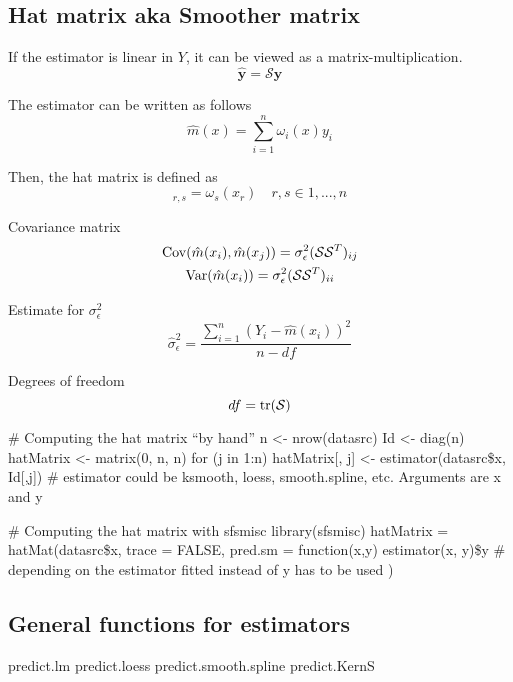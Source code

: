 \subsection{Hat matrix aka Smoother matrix}
\begin{theory}
If the estimator is linear in $Y$, it can be viewed as a matrix-multiplication.
\begin{equation*}
 \hat{\mathbf{y}} = \mathcal{S}\mathbf{y}
\end{equation*}

The estimator can be written as follows
\begin{equation*}
 \hat{m}(x) = \sum_{i=1}^n \omega_i(x)y_i
\end{equation*}

Then, the hat matrix is defined as
\begin{equation*}
 [\mathcal{S}]_{r,s} = \omega_s(x_r)\quad r,s \in {1, ..., n}
\end{equation*}

Covariance matrix
\begin{subequations}
 \begin{gather*}
  \operatorname{Cov}(\hat{m}(x_i), \hat{m}(x_j)) = \sigma_\epsilon^2(\mathcal{S}\mathcal{S}^T)_{ij}\\
  \operatorname{Var}(\hat{m}(x_i)) = \sigma_\epsilon^2(\mathcal{S}\mathcal{S}^T)_{ii}
 \end{gather*}
\end{subequations}

Estimate for $\sigma_\epsilon^2$
\begin{equation*}
 \hat{\sigma}_\epsilon^2 = \frac{\sum_{i=1}^n (Y_i - \hat{m}(x_i))^2}{n - df}
\end{equation*}

Degrees of freedom
\begin{equation*}
 df = \operatorname{tr}(\mathcal{S})
\end{equation*}

\end{theory}

\begin{code}
 # Computing the hat matrix ``by hand''
 n <- nrow(datasrc)
 Id <- diag(n)
 hatMatrix <- matrix(0, n, n)
 for (j in 1:n)
   hatMatrix[, j] <- estimator(datasrc\$x, Id[,j]) # estimator could be ksmooth, loess, smooth.spline, etc. Arguments are x and y

 # Computing the hat matrix with sfsmisc
 library(sfsmisc)
 hatMatrix = hatMat(datasrc\$x, trace = FALSE,
             pred.sm = function(x,y) estimator(x, y)\$y # depending on the estimator fitted instead of y has to be used
 )
\end{code}


\subsection{General functions for estimators}
\begin{code}
 predict.lm
 predict.loess
 predict.smooth.spline
 predict.KernS
\end{code}
